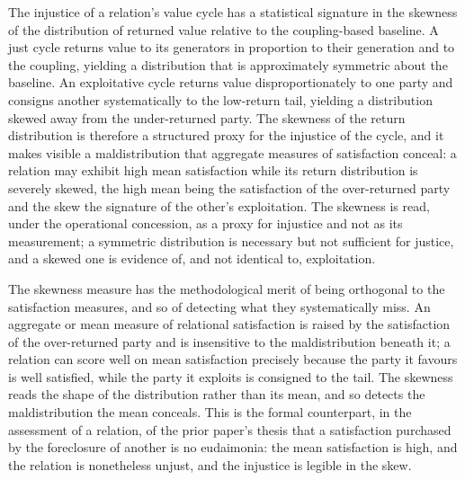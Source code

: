 \begin{claim}
The injustice of a relation's value cycle has a statistical signature in the skewness of the distribution of returned value relative to the coupling-based baseline. A just cycle returns value to its generators in proportion to their generation and to the coupling, yielding a distribution that is approximately symmetric about the baseline. An exploitative cycle returns value disproportionately to one party and consigns another systematically to the low-return tail, yielding a distribution skewed away from the under-returned party. The skewness of the return distribution is therefore a structured proxy for the injustice of the cycle, and it makes visible a maldistribution that aggregate measures of satisfaction conceal: a relation may exhibit high mean satisfaction while its return distribution is severely skewed, the high mean being the satisfaction of the over-returned party and the skew the signature of the other's exploitation. The skewness is read, under the operational concession, as a proxy for injustice and not as its measurement; a symmetric distribution is necessary but not sufficient for justice, and a skewed one is evidence of, and not identical to, exploitation.
\end{claim}

\noindent
The skewness measure has the methodological merit of being orthogonal to the satisfaction measures, and so of detecting what they systematically miss. An aggregate or mean measure of relational satisfaction is raised by the satisfaction of the over-returned party and is insensitive to the maldistribution beneath it; a relation can score well on mean satisfaction precisely because the party it favours is well satisfied, while the party it exploits is consigned to the tail. The skewness reads the shape of the distribution rather than its mean, and so detects the maldistribution the mean conceals. This is the formal counterpart, in the assessment of a relation, of the prior paper's thesis that a satisfaction purchased by the foreclosure of another is no eudaimonia: the mean satisfaction is high, and the relation is nonetheless unjust, and the injustice is legible in the skew.

